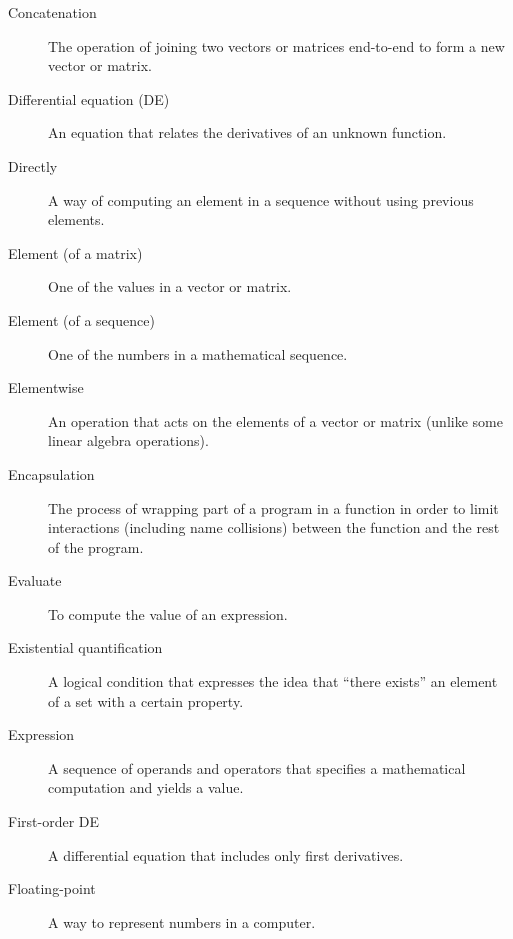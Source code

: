 \begin{description}
\item[Concatenation] The operation of joining two vectors or matrices end-to-end to
form a new vector or matrix.


\item[Differential equation (DE)] An equation that relates the
derivatives of an unknown function.

\item[Directly] A way of computing an element in a sequence without
using previous elements.



\item[Element (of a matrix)] One of the values in a vector or matrix.

\item[Element (of a sequence)] One of the numbers in a mathematical sequence.

\item[Elementwise] An operation that acts on the elements
of a vector or matrix (unlike some linear algebra operations).

\item[Encapsulation] The process of wrapping part of a program in
a function in order to limit interactions (including name collisions)
between the function and the rest of the program.

\item[Evaluate] To compute the value of an expression.

\item[Existential quantification] A logical condition that expresses the idea that ``there exists'' an element of a set with a certain property.

\item[Expression] A sequence of operands and operators that specifies
a mathematical computation and yields a value.

\item[First-order DE] A differential equation that includes only first derivatives.

\item[Floating-point] A way to represent numbers in a computer.


\end{description}
